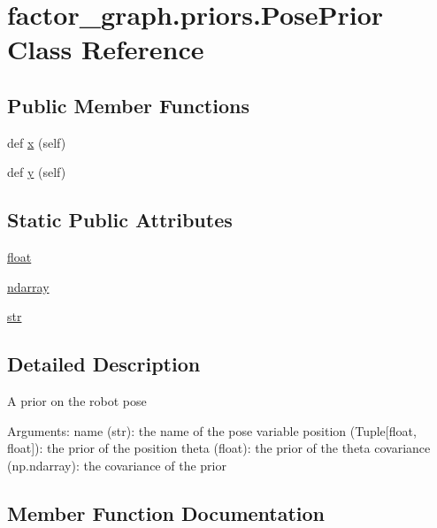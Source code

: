 \hypertarget{classfactor__graph_1_1priors_1_1PosePrior}{}\section{factor\+\_\+graph.\+priors.\+Pose\+Prior Class Reference}
\label{classfactor__graph_1_1priors_1_1PosePrior}
\subsection*{Public Member Functions}
\begin{DoxyCompactItemize}
\item
def \hyperlink{classfactor__graph_1_1priors_1_1PosePrior_a354376732015204289b46133fb79eec4}{x} (self)
\item
def \hyperlink{classfactor__graph_1_1priors_1_1PosePrior_a4437b746a6e8d1ece60ae6ed5cee7f99}{y} (self)
\end{DoxyCompactItemize}
\subsection*{Static Public Attributes}
\begin{DoxyCompactItemize}
\item
\hyperlink{classfactor__graph_1_1priors_1_1PosePrior_ad92f90f9c8170ca90a50f0bbbaf2598c}{float}
\item
\hyperlink{classfactor__graph_1_1priors_1_1PosePrior_a6f7497559a41ab52d03cab132f9ecdc8}{ndarray}
\item
\hyperlink{classfactor__graph_1_1priors_1_1PosePrior_a4f7e81f86b1d3aa2368ffa3080cd196f}{str}
\end{DoxyCompactItemize}


\subsection{Detailed Description}
\begin{DoxyVerb}A prior on the robot pose

Arguments:
    name (str): the name of the pose variable
    position (Tuple[float, float]): the prior of the position
    theta (float): the prior of the theta
    covariance (np.ndarray): the covariance of the prior
\end{DoxyVerb}


\subsection{Member Function Documentation}
\mbox{\label{classfactor__graph_1_1priors_1_1PosePrior_a354376732015204289b46133fb79eec4}}
